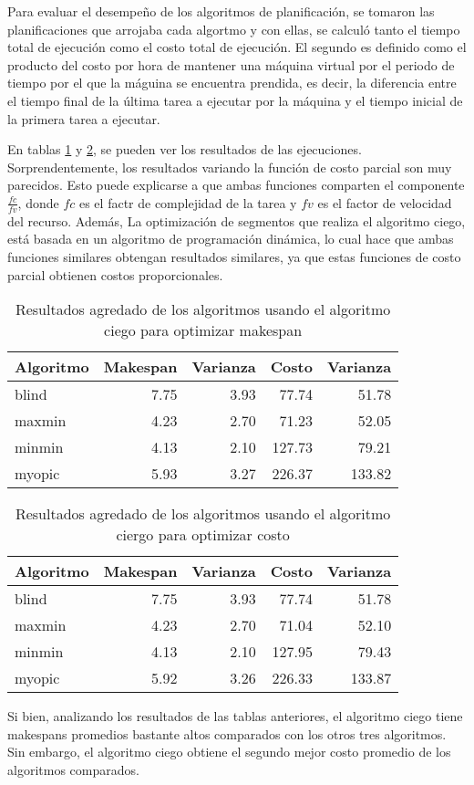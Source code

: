 Para evaluar el desempeño de los algoritmos de planificación, se tomaron las planificaciones que arrojaba cada algortmo y con ellas, se calculó tanto el tiempo total de ejecuci\'on como el costo total de ejecución. El segundo es definido como el producto del costo por hora de mantener una máquina virtual por el periodo de tiempo por el que la máguina se encuentra prendida, es decir, la diferencia entre el tiempo final de la última tarea a ejecutar por la máquina y el tiempo inicial de la primera tarea a ejecutar.

En tablas \ref{table:results_makespan} y \ref{table:results_cost}, se pueden ver los resultados de las ejecuciones. Sorprendentemente, los resultados variando la funci\'on de costo parcial son muy parecidos. Esto puede explicarse a que ambas funciones comparten el componente $\frac{fc}{fv}$, donde $fc$ es el factr de complejidad de la tarea y $fv$ es el factor de velocidad del recurso. Adem\'as, La optimizaci\'on de segmentos que realiza el algoritmo ciego, est\'a basada en un algoritmo de programaci\'on din\'amica, lo cual hace que ambas funciones similares obtengan resultados similares, ya que estas funciones de costo parcial obtienen costos proporcionales.

\begin{table}[ht]
\centering
\begin{tabular}{lrrrr}
  \hline
Algoritmo & Makespan & Varianza & Costo & Varianza \\ 
  \hline
blind & 7.75 & 3.93 & 77.74 & 51.78 \\ 
  maxmin & 4.23 & 2.70 & 71.23 & 52.05 \\ 
  minmin & 4.13 & 2.10 & 127.73 & 79.21 \\ 
  myopic & 5.93 & 3.27 & 226.37 & 133.82 \\ 
   \hline
\end{tabular}
\caption{Resultados agredado de los algoritmos usando el algoritmo ciego para optimizar makespan} 
\label{table:results_makespan}
\end{table}


\begin{table}[ht]
\centering
\begin{tabular}{lrrrr}
  \hline
Algoritmo & Makespan & Varianza & Costo & Varianza \\ 
  \hline
blind & 7.75 & 3.93 & 77.74 & 51.78 \\ 
  maxmin & 4.23 & 2.70 & 71.04 & 52.10 \\ 
  minmin & 4.13 & 2.10 & 127.95 & 79.43 \\ 
  myopic & 5.92 & 3.26 & 226.33 & 133.87 \\ 
   \hline
\end{tabular}
\caption{Resultados agredado de los algoritmos usando el algoritmo ciergo para optimizar costo} 
\label{table:results_cost}
\end{table}


Si bien, analizando los resultados de las tablas anteriores, el algoritmo ciego tiene makespans promedios bastante altos comparados con los otros tres algoritmos. Sin embargo, el algoritmo ciego obtiene el segundo mejor costo promedio de los algoritmos comparados. 
